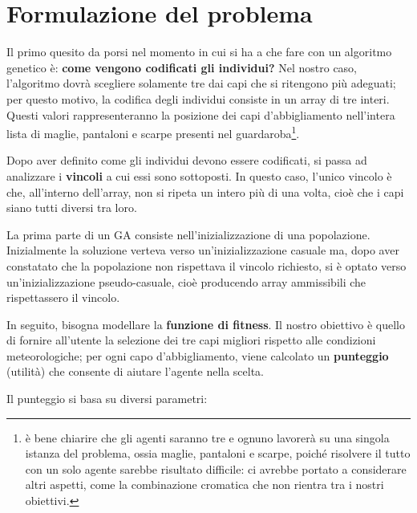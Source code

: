 \documentclass[a4paper, 11pt, oneside]{report}
\begin{document}
            \newpage
            \section{Formulazione del problema}
            Il primo quesito da porsi nel momento in cui si ha a che fare con un algoritmo genetico è: \textbf{come vengono
            codificati gli individui?} Nel nostro caso, l'algoritmo dovrà scegliere solamente tre dai capi che si ritengono
            più adeguati; per questo motivo, la codifica degli individui consiste in un array di tre interi. Questi valori
            rappresenteranno la posizione dei capi d'abbigliamento nell'intera lista di maglie, pantaloni e scarpe
            presenti nel guardaroba\footnote{è bene chiarire che gli agenti saranno tre e ognuno lavorerà su una singola
            istanza del problema, ossia maglie, pantaloni e scarpe, poiché risolvere il tutto con un solo agente sarebbe
            risultato difficile: ci avrebbe portato a considerare altri aspetti, come la combinazione
            cromatica che non rientra tra i nostri obiettivi.}.
            \\
            \par \noindent Dopo aver definito come gli individui devono essere codificati, si passa ad analizzare i \textbf{vincoli} a
            cui essi sono sottoposti. In questo caso, l'unico vincolo è che, all'interno dell'array, non si ripeta un intero
            più di una volta, cioè che i capi siano tutti diversi tra loro.
            \\
            \par \noindent La prima parte di un GA consiste nell'inizializzazione di una popolazione. Inizialmente la soluzione
            verteva verso un'inizializzazione casuale ma, dopo aver constatato che la popolazione non rispettava il vincolo richiesto,
            si è optato verso un'inizializzazione pseudo-casuale, cioè producendo array ammissibili che rispettassero il vincolo.
            \\
            \par \noindent In seguito, bisogna modellare la \textbf{funzione di fitness}.
            Il nostro obiettivo è quello di fornire all'utente la selezione dei tre capi migliori rispetto alle condizioni
            meteorologiche; per ogni capo d'abbigliamento, viene calcolato un \textbf{punteggio} (utilità) che consente di aiutare
            l'agente nella scelta.
            \\
            \par \noindent Il punteggio si basa su diversi parametri:
\end{document}
